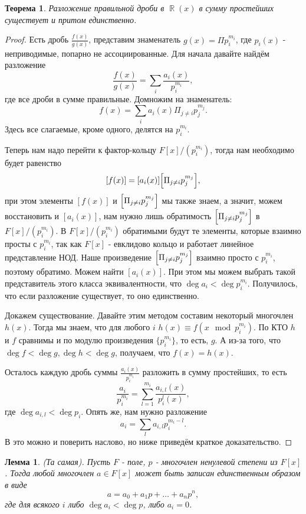 \documentclass[a4paper,100pt]{article}
\theoremstyle{indented}
\newtheorem{theorem}{Теорема}
\newtheorem{lemma}{Лемма}
\theoremstyle{definition}
\theoremstyle{remark}
\DeclareMathOperator{\RR}{\mathbb{R}}
\begin{document}
\begin{theorem}
    Разложение правильной дроби в $\RR(x)$ в сумму простейших существует и притом единственно.
\end{theorem}

\begin{proof}
    Есть дробь $\frac{f(x)}{g(x)}$, представим знаменатель $g(x)=\Pi p_i^{m_i}$, где $p_i(x)$ - неприводимые, попарно не ассоциированные. Для начала давайте найдём разложение
    \[
        \frac{f(x)}{g(x)}=\sum_i\frac{a_i(x)}{p_i^{m_i}}, 
    \]
    где все дроби в сумме правильные. Домножим на знаменатель:
    \[
        f(x)=\sum_i a_i(x)\Pi_{j\neq i}p_j^{m_j}.
    \]
    Здесь все слагаемые, кроме одного, делятся на $p_i^{m_i}$.\ 

    Теперь нам надо перейти к фактор-кольцу $F[x]/(p_i^{m_i})$, тогда нам необходимо будет равенство
    \[
        [f(x)]=[a_i(x)]\Bigl[\Pi_{j\neq i}p_j^{m_j}\Bigr], 
    \]
    при этом элементы $[f(x)]$ и $\Bigl[\Pi_{j\neq i}p_j^{m_j}\Bigr]$ мы также знаем, а значит, можем восстановить и $[a_i(x)]$, нам нужно лишь обратимость $\Bigl[\Pi_{j\neq i}p_j^{m_j}\Bigr]$ в $F[x]/(p_i^{m_i})$. В $F[x]/(p_i^{m_i})$ обратимыми будут те элементы, которые взаимно просты с $p_i^{m_i}$, так как $F[x]$ - евклидово кольцо и работает линейное представление НОД. Наше произведение $\Bigl[\Pi_{j\neq i}p_j^{m_j}\Bigr]$ взаимно просто с $p_i^{m_i}$, поэтому обратимо. Можем найти $[a_i(x)]$. При этом мы можем выбрать такой представитель этого класса эквивалентности, что $\deg a_i<\deg p_i^{m_i}$. Получилось, что если разложение существует, то оно единственно.\ 

    Докажем существование. Давайте этим методом составим некоторый многочлен $h(x)$. Тогда мы знаем, что для любого $i$ $h(x)\equiv f(x \mod p_i^{m_i})$. По КТО $h$ и $f$ сравнимы и по модулю произведения $\{p_i^{m_i}\}$, то есть, $g$. А из-за того, что $\deg f< \deg g, \deg h<\deg g$, получаем, что $f(x)=h(x)$. \

    Осталось каждую дробь суммы $\frac{a_i(x)}{p_i^{m_i}}$ разложить в сумму простейших, то есть
    \[
        \frac{a_i}{p_i^{m_i}}=\sum_{l=1}^{m_i}\frac{a_{i,l}(x)}{p_i^l(x)}, 
    \]
    где $\deg a_{i,l}<\deg p_i$. Опять же, нам нужно разложение
    \[
        a_i=\sum_l a_{i, l}p_i^{m_i-l}.
    \]
    В это можно и поверить наслово, но ниже приведём краткое доказательство.
\end{proof}

\begin{lemma}
    (Та самая). Пусть $F$ - поле, $p$ - многочлен ненулевой степени из $F[x]$. Тогда любой многочлен $a\in F[x]$ может быть записан единственным образом в виде 
    \[
        a=a_0+a_1 p+\dots+a_n p^n,
    \]
    где для всякого $i$ либо $\deg a_i<\deg p$, либо $a_i=0$.
\end{lemma}
\end{document}
